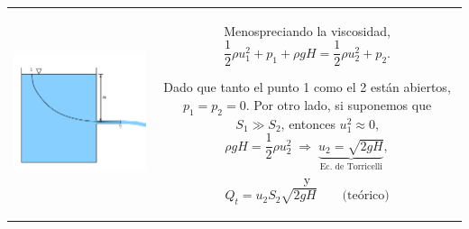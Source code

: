 	\begin{tabular}{cc}
		\begin{minipage}[c]{0.4\textwidth}%
			\begin{center}
				\includegraphics[width=\linewidth]{TeX_files/chapter04-Dinamica/deposito}
			\end{center}
		\end{minipage} & %
		\begin{minipage}[c]{0.5\textwidth}%
			Menospreciando la viscosidad, 
			\[
			\frac{1}{2}\rho u_{1}^{2}+p_{1}+\rho gH=\frac{1}{2}\rho u_{2}^{2}+p_{2}.
			\]
			
			Dado que tanto el punto 1 como el 2 están abiertos, $p_{1}=p_{2}=0$.
			Por otro lado, si suponemos que $S_{1}\gg S_{2}$, entonces $u_{1}^{2}\approx0$,
			\[
			\rho gH=\frac{1}{2}\rho u_{2}^{2}\;\Rightarrow\;\underbrace{u_{2}=\sqrt{2gH}}_{\text{Ec. de Torricelli}},
			\]
			y 
			\[
			Q_{t}=u_{2}S_{2}\sqrt{2gH}\qquad\text{(teórico)}
			\]
		\end{minipage}\tabularnewline
	\end{tabular}
	
